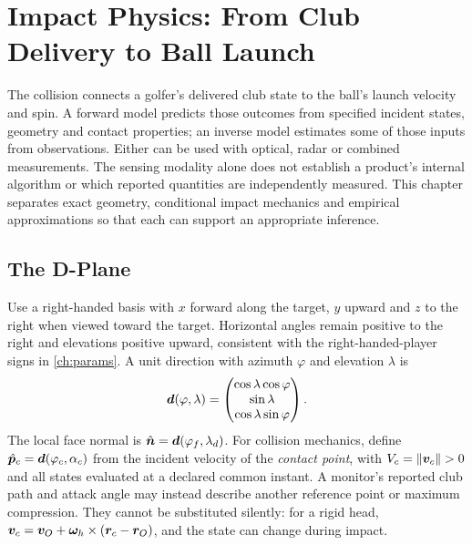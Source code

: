 \chapter{Impact Physics: From Club Delivery to Ball Launch}
\label{ch:impact}

The collision connects a golfer's delivered club state to the ball's launch velocity and spin.
A forward model predicts those outcomes from specified incident states, geometry and contact properties; an inverse model estimates some of those inputs from observations.
Either can be used with optical, radar or combined measurements.
The sensing modality alone does not establish a product's internal algorithm or which reported quantities are independently measured.
This chapter separates exact geometry, conditional impact mechanics and empirical approximations so that each can support an appropriate inference.

\section{The D-Plane}
\label{sec:dplane}

Use a right-handed basis with $x$ forward along the target, $y$ upward and $z$ to the right when viewed toward the target.
Horizontal angles remain positive to the right and elevations positive upward, consistent with the right-handed-player signs in \cref{ch:params}.
A unit direction with azimuth $\varphi$ and elevation $\lambda$ is
\begin{equation}
\label{eq:impactdirection}
\bm{d}(\varphi,\lambda)=
\begin{pmatrix}\cos\lambda\cos\varphi\\\sin\lambda\\\cos\lambda\sin\varphi\end{pmatrix}.
\end{equation}
The local face normal is $\hat{\bm{n}}=\bm{d}(\varphi_f,\lambda_d)$.
For collision mechanics, define $\hat{\bm{p}}_c=\bm{d}(\varphi_c,\alpha_c)$ from the incident velocity of the \emph{contact point}, with $V_c=\|\vect{v}_c\|>0$ and all states evaluated at a declared common instant.
A monitor's reported club path and attack angle may instead describe another reference point or maximum compression.
They cannot be substituted silently: for a rigid head, $\bm{v}_c=\bm{v}_O+\boldsymbol\omega_h\times(\bm{r}_c-\bm{r}_O)$, and the state can change during impact.

